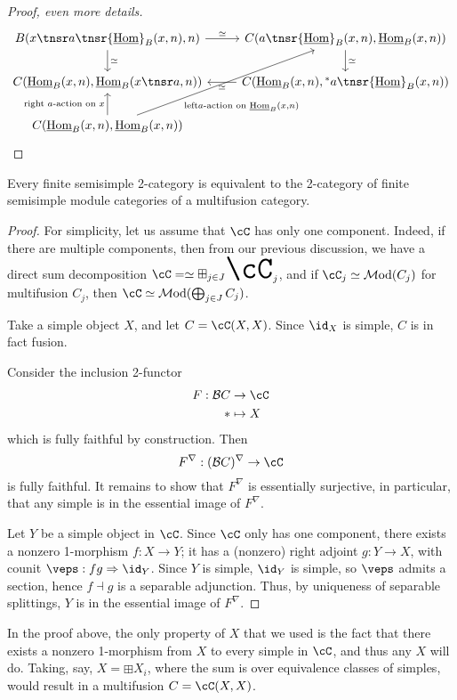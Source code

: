 \documentclass[12pt]{article}
\newcommand{\cB}{{\mathcal{B}}}
\newcommand{\Mod}{{\mathcal{M}\textrm{od}}}
\newcommand{\bigboxplus}{\Huge \boxplus}
\newcommand{\ModA}[1]{{\Mod(#1)}}
\newcommand{\ihom}{{\underline{\textrm{Hom}}}}
\begin{document}
\begin{proof}[Proof, even more details]
\[
\begin{tikzcd}
B(x \tnsr a \tnsr \ihom_B(x,n), n)
\ar[r,"\simeq"]
\ar[d,"\simeq"]
&
C(a \tnsr \ihom_B(x,n), \ihom_B(x, n))
\ar[d,"\simeq"]
\\
C(\ihom_B(x,n), \ihom_B(x \tnsr a, n))
&
C(\ihom_B(x,n), \prescript{*}{}a \tnsr \ihom_B(x, n))
\ar[l,"\simeq"]
\\
C(\ihom_B(x,n), \ihom_B(x,n))
\ar[u,"\text{right } a\text{-action on } x"]
\ar[uur,"\text{left} a\text{-action on }\ihom_B(x{,}n)"' near start]
\end{tikzcd}
\]
\end{proof}


\begin{theorem}
Every finite semisimple 2-category is equivalent to
the 2-category of finite semisimple module categories
of a multifusion category.
\end{theorem}

\begin{proof}
For simplicity, let us assume that $\cC$ has only one component.
Indeed, if there are multiple components,
then from our previous discussion,
we have a direct sum decomposition
$\cC =\simeq \bigboxplus_{j \in J} \cC_j$,
and if $\cC_j \simeq \ModA{C_j}$ for multifusion $C_j$,
then $\cC \simeq \ModA{\bigoplus_{j \in J} C_j}$.

Take a simple object $X$,
and let $C = \cC(X,X)$.
Since $\id_X$ is simple, $C$ is in fact fusion.

Consider the inclusion 2-functor
\begin{align*}
F : \cB C &\to \cC
\\
* &\mapsto X
\end{align*}
which is fully faithful by construction.
Then
\[
F^\nabla: (\cB C)^\nabla \to \cC
\]
is fully faithful.
It remains to show that $F^\nabla$ is essentially surjective,
in particular, that any simple is in the essential image
of $F^\nabla$.

Let $Y$ be a simple object in $\cC$.
Since $\cC$ only has one component,
there exists a nonzero 1-morphism
$f: X \to Y$;
it has a (nonzero) right adjoint $g: Y \to X$,
with counit $\veps : fg \Rightarrow \id_Y$.
Since $Y$ is simple, $\id_Y$ is simple,
so $\veps$ admits a section,
hence $f \dashv g$ is a separable adjunction.
Thus, by uniqueness of separable splittings,
$Y$ is in the essential image of $F^\nabla$.
\end{proof}


In the proof above,
the only property of $X$ that we used is the fact that
there exists a nonzero 1-morphism from $X$ to every simple
in $\cC$,
and thus any $X$ will do.
Taking, say, $X = \boxplus X_i$,
where the sum is over equivalence classes of simples,
would result in a multifusion $C = \cC(X,X)$.
\end{document}
